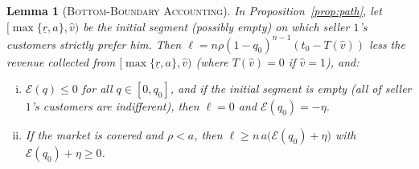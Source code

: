 \documentclass[12pt]{article}
\theoremstyle{mystyle}
\newtheorem{lemma}{Lemma}
\theoremstyle{mystyle2}
\newcommand{\1}{\mathbf{1}}
\begin{document}
\begin{lemma}[\textsc{Bottom-Boundary Accounting}]\label{lem:path_detail}
In Proposition~\ref{prop:path}, let $[\max\{\underline r,a\},\hat v)$ be the initial segment (possibly empty) on which seller $1$'s customers strictly prefer him. Then $\ell=n\rho(1-q_0)^{n-1}(t_0-T(\hat v))$ less the revenue collected from $[\max\{\underline r,a\},\hat v)$ (where $T(\hat v)=0$ if $\hat v=1$), and:
\begin{enumerate}[(i)]
\item $\mathcal E(q)\le 0$ for all $q\in[0,q_0]$, and if the initial segment is empty (all of seller $1$'s customers are indifferent), then $\ell=0$ and $\mathcal E(q_0)=-\eta$.
\item If the market is covered and $\rho<a$, then $\ell\ge n\,a\bigl(\mathcal E(q_0)+\eta\bigr)$ with $\mathcal E(q_0)+\eta\ge 0$.
\end{enumerate}
\end{lemma}
\end{document}

